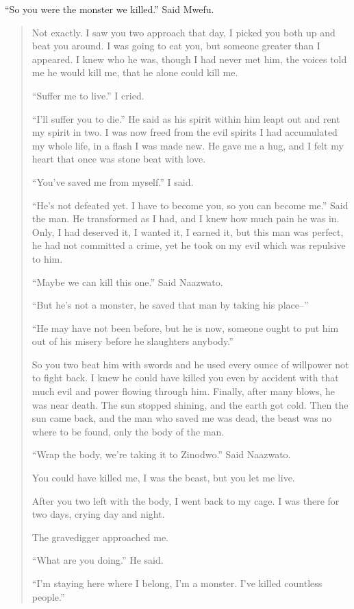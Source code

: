 ``So you were the monster we killed.'' Said Mwefu.

\begin{quote}
Not exactly. I saw you two approach that day, I picked you both up and beat you around. I was going to eat you, but someone greater than I appeared. I knew who he was, though I had never met him, the voices told me he would kill me, that he alone could kill me.

``Suffer me to live.'' I cried.

``I'll suffer you to die.'' He said as his spirit within him leapt out and rent my spirit in two. I was now freed from the evil spirits I had accumulated my whole life, in a flash I was made new. He gave me a hug, and I felt my heart that once was stone beat with love.

``You've saved me from myself.'' I said.

``He's not defeated yet. I have to become you, so you can become me.'' Said the man. He transformed as I had, and I knew how much pain he was in. Only, I had deserved it, I wanted it, I earned it, but this man was perfect, he had not committed a crime, yet he took on my evil which was repulsive to him.

``Maybe we can kill this one.'' Said Naazwato.

``But he's not a monster, he saved that man by taking his place--''

``He may have not been before, but he is now, someone ought to put him out of his misery before he slaughters anybody.''

So you two beat him with swords and he used every ounce of willpower not to fight back. I knew he could have killed you even by accident with that much evil and power flowing through him. Finally, after many blows, he was near death. The sun stopped shining, and the earth got cold. Then the sun came back, and the man who saved me was dead, the beast was no where to be found, only the body of the man.

``Wrap the body, we're taking it to Zinodwo.'' Said Naazwato.

You could have killed me, I was the beast, but you let me live.

After you two left with the body, I went back to my cage. I was there for two days, crying day and night.

The gravedigger approached me.

``What are you doing.'' He said.

``I'm staying here where I belong, I'm a monster. I've killed countless people.''


\end{quote}

